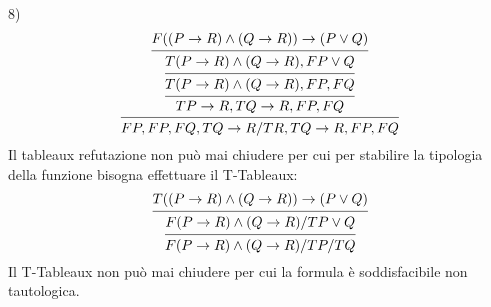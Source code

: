 8)
\begin{equation*}
\begin{prooftree}
\hypo{F ((P \rightarrow R) \land (Q \rightarrow R)) \rightarrow (P \lor Q)}
\infer1{T (P \rightarrow R) \land (Q \rightarrow R),F P \lor Q}
\infer1{T (P \rightarrow R) \land (Q \rightarrow R),FP,FQ}
\infer1{T P \rightarrow R,T Q \rightarrow R,FP,FQ}
\infer1{FP,FP,FQ,T Q \rightarrow R/TR,T Q \rightarrow R,FP,FQ}
\end{prooftree}
\end{equation*}
Il tableaux refutazione non può mai chiudere per cui per stabilire la tipologia
della funzione bisogna effettuare il T-Tableaux:
\begin{equation*}
\begin{prooftree}
\hypo{T ((P \rightarrow R) \land (Q \rightarrow R)) \rightarrow (P \lor Q)}
\infer1{F (P \rightarrow R) \land (Q \rightarrow R)/T P \lor Q}
\infer1{F (P \rightarrow R) \land (Q \rightarrow R)/TP/TQ}
\end{prooftree}
\end{equation*}
Il T-Tableaux non può mai chiudere per cui la formula è soddisfacibile non tautologica.
